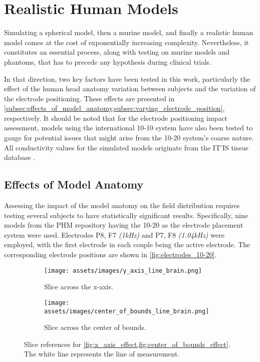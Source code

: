 \section{Realistic Human Models}
\label{sec:realistic_human_models}

Simulating a spherical model, then a murine model, and finally a realistic human model comes at the cost of exponentially increasing complexity. Nevertheless, it constitutes an essential process, along with testing on murine models and phantoms, that has to precede any hypothesis during clinical trials.

In that direction, two key factors have been tested in this work, particularly the effect of the human head anatomy variation between subjects and the variation of the electrode positioning. These effects are presented in \cref{subsec:effects_of_model_anatomy,subsec:varying_electrode_position}, respectively. It should be noted that for the electrode positioning impact assessment, models using the international 10-10 system have also been tested to gauge for potential issues that might arise from the 10-20 system's coarse nature. All conductivity values for the simulated models originate from the \gls{IT'IS} tissue database \cite{ITstissue}.

\subsection{Effects of Model Anatomy}
\label{subsec:effects_of_model_anatomy}

Assessing the impact of the model anatomy on the field distribution requires testing several subjects to have statistically significant results. Specifically, nine models from the \gls{PHM} repository \cite{ErikG.Lee2016} having the 10-20 as the electrode placement system were used. Electrodes P8, F7 \textit{(1\si{kHz})} and P7, F8 \textit{(1.04\si{kHz})} were employed, with the first electrode in each couple being the active electrode. The corresponding electrode positions are shown in \autoref{fig:electrodes_10-20}.

\begin{figure}[H]
    \centering
    \begin{subfigure}[b]{0.49\textwidth}
        \texttt{[image: assets/images/y\_axis\_line\_brain.png]}
        \caption{Slice across the x-axis.}
        \label{fig:brain_slice_for_effects_x}
    \end{subfigure}
    \begin{subfigure}[b]{0.49\textwidth}
        \texttt{[image: assets/images/center\_of\_bounds\_line\_brain.png]}
        \caption{Slice across the center of bounds.}
        \label{fig:brain_slice_for_effects_cf}
    \end{subfigure}
    \caption{Slice references for \cref{fig:x_axis_effect,fig:center_of_bounds_effect}. The white line represents the line of measurement.}
    \label{fig:brain_slice_for_effects}
\end{figure}

